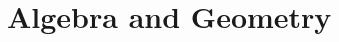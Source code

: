 \documentclass[../precalc.tex]{subfiles}
\begin{document}
\chapter{Algebra and Geometry}
\end{document}
